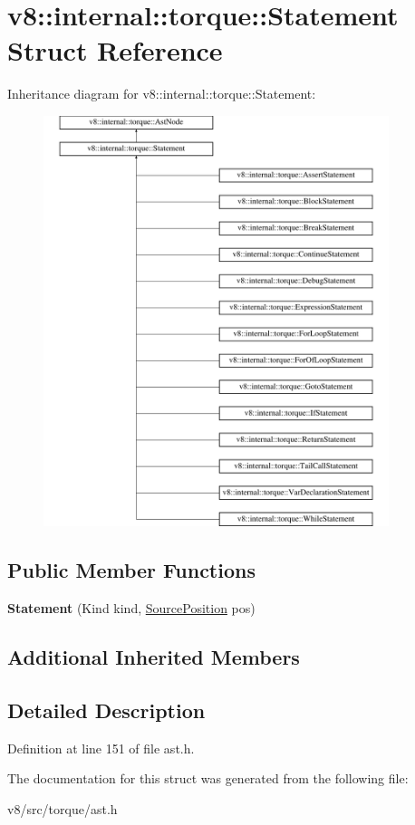 \hypertarget{structv8_1_1internal_1_1torque_1_1Statement}{}\section{v8\+:\+:internal\+:\+:torque\+:\+:Statement Struct Reference}
\label{structv8_1_1internal_1_1torque_1_1Statement}
Inheritance diagram for v8\+:\+:internal\+:\+:torque\+:\+:Statement\+:\begin{figure}[H]
\begin{center}
\leavevmode
\includegraphics[height=12.000000cm]{structv8_1_1internal_1_1torque_1_1Statement}
\end{center}
\end{figure}
\subsection*{Public Member Functions}
\begin{DoxyCompactItemize}
\item 
\mbox{\label{structv8_1_1internal_1_1torque_1_1Statement_a455da4f26ad8ec135a559679a311fc7f}} 
{\bfseries Statement} (Kind kind, \mbox{\hyperlink{structv8_1_1internal_1_1torque_1_1SourcePosition}{Source\+Position}} pos)
\end{DoxyCompactItemize}
\subsection*{Additional Inherited Members}


\subsection{Detailed Description}


Definition at line 151 of file ast.\+h.



The documentation for this struct was generated from the following file\+:\begin{DoxyCompactItemize}
\item 
v8/src/torque/ast.\+h\end{DoxyCompactItemize}
